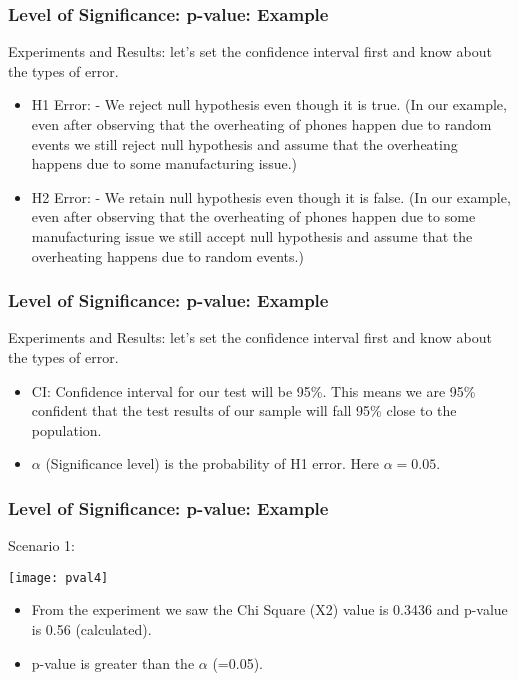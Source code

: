 \begin{frame}[fragile]\frametitle{Level of Significance: p-value: Example}
Experiments and Results: let’s set the confidence interval first and know about the types of error.

\begin{itemize}
\item H1 Error: - We reject null hypothesis even though it is true. (In our example, even after observing that the overheating of phones happen due to random events we still reject null hypothesis and assume that the overheating happens due to some manufacturing issue.)

\item H2 Error: - We retain null hypothesis even though it is false. (In our example, even after observing that the overheating of phones happen due to some manufacturing issue we still accept null hypothesis and assume that the overheating happens due to random events.)

\end{itemize}

\end{frame}

\begin{frame}[fragile]\frametitle{Level of Significance: p-value: Example}
Experiments and Results: let’s set the confidence interval first and know about the types of error.

\begin{itemize}

\item CI: Confidence interval for our test will be 95\%. This means we are 95\% confident that the test results of our sample will fall 95\% close to the population.

\item $\alpha$ (Significance level) is the probability of H1 error. Here $\alpha = 0.05$.
\end{itemize}

\end{frame}

\begin{frame}[fragile]\frametitle{Level of Significance: p-value: Example}
Scenario 1:

\begin{center}
\texttt{[image: pval4]}
\end{center}

\begin{itemize}
\item From the experiment we saw the Chi Square (X2) value is 0.3436 and p-value is 0.56 (calculated).
\item  p-value is greater than the $\alpha$ (=0.05).
\end{itemize}
\end{frame}

